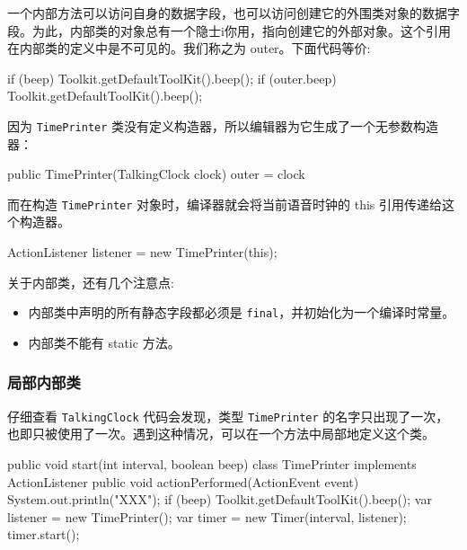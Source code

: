 一个内部方法可以访问自身的数据字段，也可以访问创建它的外围类对象的数据字段。为此，内部类的对象总有一个隐士i你用，指向创建它的外部对象。这个引用在内部类的定义中是不可见的。我们称之为 outer。下面代码等价:

\begin{Java}
if (beep) Toolkit.getDefaultToolKit().beep();
if (outer.beep) Toolkit.getDefaultToolKit().beep();
\end{Java}

因为 \texttt{TimePrinter} 类没有定义构造器，所以编辑器为它生成了一个无参数构造器：
\begin{Java}
public TimePrinter(TalkingClock clock) {
    outer = clock
}
\end{Java}

而在构造 \texttt{TimePrinter} 对象时，编译器就会将当前语音时钟的 this 引用传递给这个构造器。

\begin{Java}
ActionListener listener = new TimePrinter(this);
\end{Java}

关于内部类，还有几个注意点:
\begin{itemize}
    \item 内部类中声明的所有静态字段都必须是 \texttt{final}，并初始化为一个编译时常量。
    \item 内部类不能有 static 方法。
\end{itemize}


\subsubsection{局部内部类}

仔细查看 \texttt{TalkingClock} 代码会发现，类型 \texttt{TimePrinter} 的名字只出现了一次，也即只被使用了一次。遇到这种情况，可以在一个方法中局部地定义这个类。

\begin{Java}
public void start(int interval, boolean beep) {
    class TimePrinter implements ActionListener {
        public void actionPerformed(ActionEvent event) {
            System.out.println("XXX");
            if (beep) Toolkit.getDefaultToolKit().beep();
        }
    }
    var listener = new TimePrinter();
    var timer = new Timer(interval, listener);
    timer.start();
}
\end{Java}

